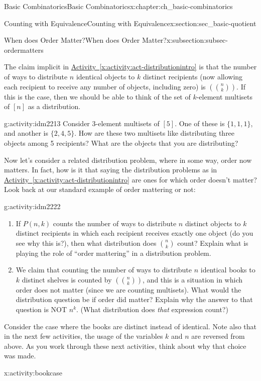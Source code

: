 \documentclass[oneside,10pt,]{book}
\numberwithin{equation}{chapter}
\newcommand{\mchoose}[2]{\left(\!\binom{#1}{#2}\!\right)}
\begin{document}
\begin{chapterptx}{Basic Combinatorics}{}{Basic Combinatorics}{}{}{x:chapter:ch_basic-combinatorics}
\begin{sectionptx}{Counting with Equivalence}{}{Counting with Equivalence}{}{}{x:section:sec_basic-quotient}
\begin{subsectionptx}{When does Order Matter?}{}{When does Order Matter?}{}{}{x:subsection:subsec-ordermatters}
\par
The claim implicit in \hyperref[x:activity:act-distributionintro]{Activity~\ref{x:activity:act-distributionintro}} is that the number of ways to distribute \(n\) identical objects to \(k\) distinct recipients (now allowing each recipient to receive any number of objects, including zero) is \(\mchoose{n}{k}\).  If this is the case, then we should be able to think of the set of \(k\)-element multisets of \([n]\) as a distribution.%
\begin{activity}{}{g:activity:idm2213}%
Consider \(3\)-element multisets of \([5]\).  One of these is \(\{1,1,1\}\), and another is \(\{2,4,5\}\).  How are these two multisets like distributing three objects among 5 recipients?  What are the objects that you are distributing?%
\end{activity}
Now let's consider a related distribution problem, where in some way, order now matters.  In fact, how is it that saying the distribution problems as in \hyperref[x:activity:act-distributionintro]{Activity~\ref{x:activity:act-distributionintro}} are ones for which order doesn't matter?  Look back at our standard example of order mattering or not:%
\begin{activity}{}{g:activity:idm2222}%
\begin{enumerate}[font=\bfseries,label=(\alph*),ref=\alph*]
\item{}If \(P(n,k)\) counts the number of ways to distribute \(n\) distinct objects to \(k\) distinct recipients in which each recipient receives exactly one object (do you see why this is?), then what distribution does \(\binom{n}{k}\) count?  Explain what is playing the role of ``order mattering'' in a distribution problem.%
\item{}We claim that counting the number of ways to distribute \(n\) identical books to \(k\) distinct shelves is counted by \(\mchoose{n}{k}\), and this is a situation in which order does not matter (since we are counting multisets).  What would the distribution question be if order did matter?  Explain why the answer to that question is NOT \(n^k\). (What distribution does \emph{that} expression count?)%
\end{enumerate}
\end{activity}
Consider the case where the books are distinct instead of identical.  Note also that in the next few activities, the usage of the variables \(k\) and \(n\) are reversed from above.  As you work through these next activities, think about why that choice was made.%
\begin{activity}{}{x:activity:bookcase}%

\end{activity}
\end{subsectionptx}
\end{sectionptx}
\end{chapterptx}
\end{document}
